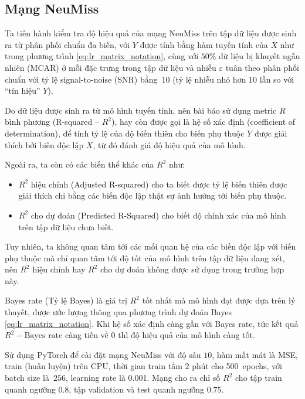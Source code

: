 \subsection{Mạng NeuMiss}
Ta tiến hành kiểm tra độ hiệu quả của mạng NeuMiss trên tập dữ liệu 
được sinh ra từ phân phối chuẩn đa biến, với $Y$ được tính bằng hàm tuyến tính của $X$ như trong phương trình \eqref{eq:lr_matrix_notation}, cùng với $50\%$ dữ liệu bị khuyết ngẫu nhiên (MCAR) ở mỗi đặc trưng trong tập dữ liệu và nhiễu $\varepsilon$ tuân theo phân phối chuẩn với tỷ lệ signal-to-noise (SNR) bằng~$10$ (tỷ lệ nhiễu nhỏ hơn $10$ lần so với ``tín hiệu'' $Y$).

Do dữ liệu được sinh ra từ mô hình tuyến tính, nên bài báo sử dụng metric $R$ bình phương (R-squared -- $R^2$), hay còn được gọi là hệ số xác định (coefficient of determination), để tính 
tỷ lệ của độ biến thiên cho biến phụ thuộc $Y$ được giải thích bởi biến độc lập $X$, từ đó đánh giá độ hiệu quả của mô hình. 

Ngoài ra, ta còn có các biến thể khác của $R^2$ như:
\begin{itemize}
    \item $R^2$ hiệu chỉnh (Adjusted R-squared) cho ta biết được tỷ lệ biến thiên được giải thích chỉ bằng các biến độc lập thật sự ảnh hưởng tới biến phụ thuộc.
    \item $R^2$ cho dự đoán (Predicted R-Squared) cho biết độ chính xác của mô hình trên tập dữ liệu chưa biết.
\end{itemize}

Tuy nhiên, ta không quan tâm tới các mối quan hệ của các biến độc lập với biến phụ thuộc mà chỉ quan tâm tới độ tốt của mô hình trên tập dữ liệu đang xét, nên $R^2$ hiệu chỉnh hay $R^2$ cho dự đoán không được sử dụng trong trường hợp này.

Bayes rate (Tỷ lệ Bayes) là giá trị $R^2$ tốt nhất mà mô hình đạt được dựa trên lý thuyết, được ước lượng thông qua phương trình dự đoán Bayes \eqref{eq:lr_matrix_notation}.
Khi hệ số xác định càng gần với Bayes rate, tức kết quả $R^2 - \text{Bayes rate}$ càng tiến về $0$ thì độ hiệu quả của mô hình càng tốt. 


Sử dụng PyTorch để cài đặt mạng NeuMiss với độ sâu $10$, hàm mất mát là MSE, train (huấn luyện) trên CPU, thời gian train tầm $2$ phút cho 500~epochs, với batch size là~$256$, learning rate là 0.001.
Mạng cho ra chỉ số $R^2$ cho tập train quanh ngưỡng $0.8$, tập validation và test quanh ngưỡng $0.75$.



